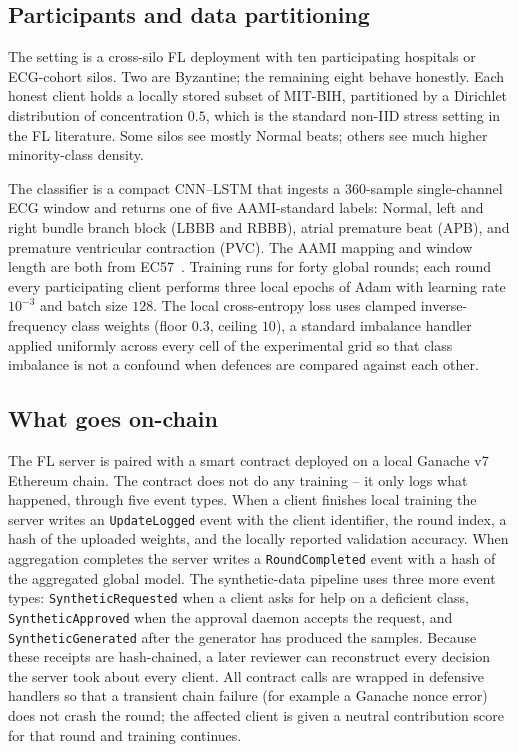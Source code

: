 \documentclass[runningheads]{llncs}
\begin{document}
\subsection{Participants and data partitioning}
The setting is a cross-silo FL deployment with ten participating
hospitals or ECG-cohort silos. Two are Byzantine; the remaining
eight behave honestly. Each honest client holds a locally stored subset of
MIT-BIH, partitioned by a Dirichlet distribution of concentration
$0.5$, which is the standard non-IID stress setting in the FL
literature. Some silos see mostly Normal beats; others see much
higher minority-class density.

The classifier is a compact CNN--LSTM that ingests a 360-sample
single-channel ECG window and returns one of five AAMI-standard
labels: Normal, left and right bundle branch block (LBBB and RBBB),
atrial premature beat (APB), and premature ventricular contraction
(PVC). The AAMI mapping and window length are both from
EC57~\cite{aami1998ec57}. Training runs for forty global rounds;
each round every participating client performs three local epochs of
Adam with learning rate $10^{-3}$ and batch size $128$. The local
cross-entropy loss uses clamped inverse-frequency class weights
(floor $0.3$, ceiling $10$), a standard imbalance handler applied
uniformly across every cell of the experimental grid so that class
imbalance is not a confound when defences are compared against each
other.

\subsection{What goes on-chain}
The FL server is paired with a smart contract deployed on a local
Ganache v7 Ethereum chain. The contract does not do any training --
it only logs what happened, through five event types. When a client
finishes local training the server writes an \texttt{UpdateLogged}
event with the client identifier, the round index, a hash of the
uploaded weights, and the locally reported validation accuracy.
When aggregation completes the server writes a
\texttt{RoundCompleted} event with a hash of the aggregated global
model. The synthetic-data pipeline uses three more event types:
\texttt{SyntheticRequested} when a client asks for help on a
deficient class, \texttt{SyntheticApproved} when the approval daemon
accepts the request, and \texttt{SyntheticGenerated} after the
generator has produced the samples. Because these receipts are
hash-chained, a later reviewer can reconstruct every decision the
server took about every client. All contract calls are wrapped in
defensive handlers so that a transient chain failure (for example a
Ganache nonce error) does not crash the round; the affected client
is given a neutral contribution score for that round and training
continues.
\end{document}
